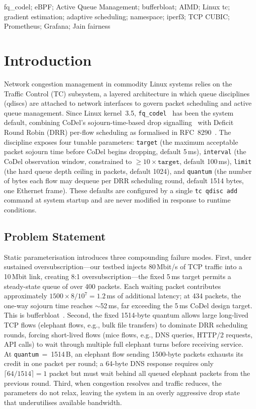 \documentclass[conference]{IEEEtran}
\begin{document}
\begin{IEEEkeywords}
fq\_codel; eBPF; Active Queue Management; bufferbloat; AIMD; Linux tc;
gradient estimation; adaptive scheduling; namespace; iperf3; TCP CUBIC;
Prometheus; Grafana; Jain fairness
\end{IEEEkeywords}

\section{Introduction}

Network congestion management in commodity Linux systems relies on the Traffic
Control (TC) subsystem, a layered architecture in which queue disciplines
(qdiscs) are attached to network interfaces to govern packet scheduling and
active queue management. Since Linux kernel~3.5, \texttt{fq\_codel}~\cite{nichols2012}
has been the system default, combining CoDel's sojourn-time-based drop
signalling~\cite{nichols2012} with Deficit Round Robin (DRR) per-flow
scheduling as formalised in RFC~8290~\cite{rfc8290}. The discipline exposes
four tunable parameters: \texttt{target} (the maximum acceptable packet sojourn
time before CoDel begins dropping, default 5\,ms), \texttt{interval} (the CoDel
observation window, constrained to $\geq 10\times\texttt{target}$, default
100\,ms), \texttt{limit} (the hard queue depth ceiling in packets, default
1024), and \texttt{quantum} (the number of bytes each flow may dequeue per DRR
scheduling round, default 1514 bytes, one Ethernet frame). These defaults are
configured by a single \texttt{tc qdisc add} command at system startup and are
never modified in response to runtime conditions.

\subsection{Problem Statement}

Static parameterisation introduces three compounding failure modes. First, under
sustained oversubscription---our testbed injects 80\,Mbit/s of TCP traffic
into a 10\,Mbit link, creating 8:1 oversubscription---the fixed 5\,ms target
permits a steady-state queue of over 400 packets. Each waiting packet
contributes approximately $1500 \times 8 / 10^7 = 1.2$\,ms of additional
latency; at 434 packets, the one-way sojourn time reaches $\sim$52\,ms, far
exceeding the 5\,ms CoDel design target. This is bufferbloat~\cite{gettys2012}.
Second, the fixed 1514-byte quantum allows large long-lived TCP flows (elephant
flows, e.g., bulk file transfers) to dominate DRR scheduling rounds, forcing
short-lived flows (mice flows, e.g., DNS queries, HTTP/2 requests, API calls)
to wait through multiple full elephant turns before receiving service. At
\texttt{quantum}~=~1514\,B, an elephant flow sending 1500-byte packets exhausts
its credit in one packet per round; a 64-byte DNS response requires only
$\lceil 64/1514 \rceil = 1$ packet but must wait behind all queued elephant
packets from the previous round. Third, when congestion resolves and traffic
reduces, the parameters do not relax, leaving the system in an overly aggressive
drop state that underutilises available bandwidth.
\end{document}
